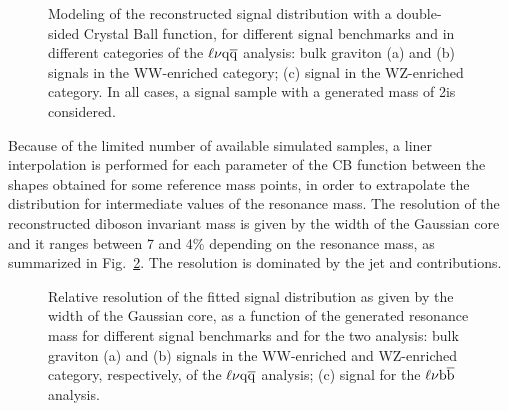 \begin{figure}[!htb]
\centering
{}
\caption{Modeling of the reconstructed signal distribution with a double-sided Crystal Ball function, for different signal benchmarks and in different \mJ categories of the $\ell\nu\mathrm{q}\overline{\mathrm{q}}$ analysis: 
bulk graviton (a) and \Zpr (b) signals in the WW-enriched category; (c) \Wpr signal in the WZ-enriched category. In all cases, a signal sample with a generated mass of 2\TeV is considered.}
\label{fig:mWVfit-signal-13TeV}
\end{figure}

Because of the limited number of available simulated samples, a liner interpolation is performed for each parameter of the CB function between
the shapes obtained for some reference mass points, in order to extrapolate the distribution for intermediate values of the resonance mass.
The resolution of the reconstructed diboson invariant mass is given by the width of the Gaussian core and it ranges between 7 and 4\% depending on the resonance mass, as summarized in Fig.~\ref{fig:relCB}.
The resolution is dominated by the jet and \ETmiss contributions.

\begin{figure}[!htb]
\centering
{}
\caption{Relative resolution of the fitted signal distribution as given by the width of the Gaussian core, as a function of the generated resonance mass for different signal benchmarks and for the two analysis:
bulk graviton (a) and \Wpr (b) signals in the WW-enriched and WZ-enriched category, respectively, of the $\ell\nu\mathrm{q}\overline{\mathrm{q}}$ analysis; (c) \Wpr signal for the $\ell\nu{\mathrm{b}\overline{\mathrm{b}}}$ analysis.}
\label{fig:relCB}
\end{figure}

